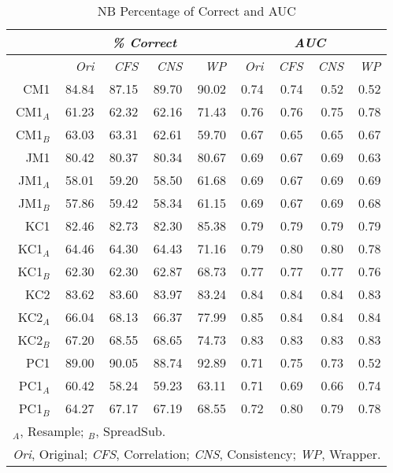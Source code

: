 \documentclass{elsart}
\begin{document}
\begin{table}[t]
\caption{NB Percentage of Correct and AUC} \label{tab:NBCorrectAUC}
\begin{center}
\begin{small}
\begin{tabular}{r|rrrr|rrrr}
\hline
\multicolumn{ 1}{c}{} & \multicolumn{ 4}{c}{\emph{\% Correct}} &  \multicolumn{ 4}{c}{\emph{AUC}} \\
\hline
 & \emph{Ori} & \emph{CFS} & \emph{CNS} & \emph{WP} & \emph{Ori} & \emph{CFS} & \emph{CNS} & \emph{WP} \\
\hline \hline
     CM1 & 84.84 &  87.15 &  89.70 &  90.02 &  0.74 &  0.74 &  0.52 & 0.52  \\
 CM1$_A$ & 61.23 &  62.32 &  62.16 &  71.43 &  0.76 &  0.76 &  0.75 & 0.78  \\
 CM1$_B$ & 63.03 &  63.31 &  62.61 &  59.70 &  0.67 &  0.65 &  0.65 & 0.67 \\
     JM1 & 80.42 &  80.37 &  80.34 &  80.67 &  0.69 &  0.67 &  0.69 & 0.63  \\
 JM1$_A$ & 58.01 &  59.20 &  58.50 &  61.68 &  0.69 &  0.67 &  0.69 & 0.69  \\
 JM1$_B$ & 57.86 &  59.42 &  58.34 &  61.15 &  0.69 &  0.67 &  0.69 & 0.68 \\
     KC1 & 82.46 &  82.73 &  82.30 &  85.38 &  0.79 &  0.79 &  0.79 & 0.79 \\
 KC1$_A$ & 64.46 &  64.30 &  64.43 &  71.16 &  0.79 &  0.80 &  0.80 & 0.78  \\
 KC1$_B$ & 62.30 &  62.30 &  62.87 &  68.73 &  0.77 &  0.77 &  0.77 & 0.76 \\
     KC2 & 83.62 &  83.60 &  83.97 &  83.24 &  0.84 &  0.84 &  0.84 & 0.83 \\
 KC2$_A$ & 66.04 &  68.13 &  66.37 &  77.99 &  0.85 &  0.84 &  0.84 & 0.84  \\
 KC2$_B$ & 67.20 &  68.55 &  68.65 &  74.73 &  0.83 &  0.83 &  0.83 & 0.83 \\
     PC1 & 89.00 &  90.05 &  88.74 &  92.89 &  0.71 &  0.75 &  0.73 & 0.52  \\
 PC1$_A$ & 60.42 &  58.24 &  59.23 &  63.11 &  0.71 &  0.69 &  0.66 & 0.74  \\
 PC1$_B$ & 64.27 &  67.17 &  67.19 &  68.55 &  0.72 &  0.80 &  0.79 & 0.78  \\
\hline
\multicolumn{9}{l}{\scriptsize $_{A}$, Resample; $_{B}$, SpreadSub.}\\
\multicolumn{9}{l}{\scriptsize \emph{Ori}, Original; \emph{CFS}, Correlation; \emph{CNS}, Consistency; \emph{WP}, Wrapper.}\\
\end{tabular}
\end{small}
\end{center}
\end{table}
\end{document}
